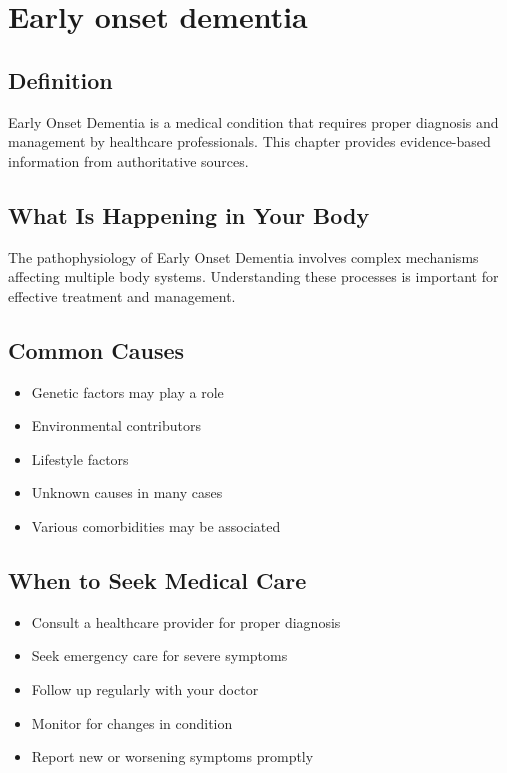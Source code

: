 
\chapter{Early onset dementia}

\section*{Definition}
Early Onset Dementia is a medical condition that requires proper diagnosis and management by healthcare professionals. This chapter provides evidence-based information from authoritative sources.

\section*{What Is Happening in Your Body}
The pathophysiology of Early Onset Dementia involves complex mechanisms affecting multiple body systems. Understanding these processes is important for effective treatment and management.

\section*{Common Causes}
\begin{itemize}
  \item Genetic factors may play a role
  \item Environmental contributors
  \item Lifestyle factors
  \item Unknown causes in many cases
  \item Various comorbidities may be associated
\end{itemize}

\section*{When to Seek Medical Care}
\begin{itemize}
  \item Consult a healthcare provider for proper diagnosis
  \item Seek emergency care for severe symptoms
  \item Follow up regularly with your doctor
  \item Monitor for changes in condition
  \item Report new or worsening symptoms promptly
\end{itemize}

